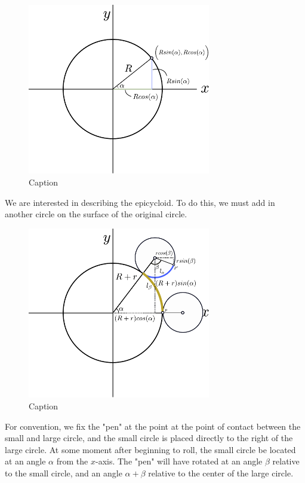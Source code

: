 \begin{figure}[H]
    \centering
    \includegraphics[width=8cm]{figures/unitcircle2.pdf}    
    \caption{Caption}
    \label{fig:my_label}
\end{figure}

We are interested in describing the epicycloid. To do this, we must add in another circle on the surface of the original circle.

\begin{figure}[H]
    \centering
    \includegraphics[width=8cm]{figures/epicycloid1.pdf}    
    \caption{Caption}
    \label{fig:my_label}
\end{figure}

For convention, we fix the "pen" at the point at the point of contact between the small and large circle, and the small circle is placed directly to the right of the large circle. At some moment after beginning to roll, the small circle be located at an angle $\alpha$ from the $x$-axis. The "pen" will have rotated at an angle $\beta$ relative to the small circle, and an angle $\alpha+\beta$ relative to the center of the large circle. 

